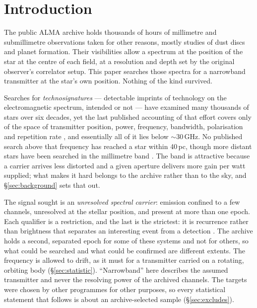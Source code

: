 \section{Introduction}
\label{sec:intro}

The public ALMA archive holds thousands of hours of millimetre and
submillimetre observations taken for other reasons, mostly studies of dust
discs and planet formation. Their visibilities allow a spectrum at the
position of the star at the centre of each field, at a resolution and depth
set by the original observer's correlator setup. This paper searches those
spectra for a narrowband transmitter at the star's own position. Nothing of
the kind survived.

Searches for \emph{technosignatures} --- detectable imprints of technology on
the electromagnetic spectrum, intended or not
\citep{Sheikh2020,SETIreview2025} --- have examined many thousands of stars
over six decades, yet the last published accounting of that effort covers
only \HaystackFrac{} of the space of transmitter position, power, frequency,
bandwidth, polarisation and repetition rate
\citep{Wright2018}, and essentially all of it lies below
${\sim}30$\,GHz. No published search above that frequency has reached a star
within 40\,pc, though more distant stars have been searched in the
millimetre band \citep{Mason2025}. The band is attractive because a carrier
arrives less distorted and a given aperture delivers more gain per watt
supplied; what makes it hard belongs to the archive rather than to the sky,
and \S\ref{sec:background} sets that out.

The signal sought is an \emph{unresolved spectral carrier}: emission confined
to a few channels, unresolved at the stellar position, and present at more
than one epoch. Each qualifier is a restriction, and the last is the
strictest: it is recurrence rather than brightness that separates an
interesting event from a detection \citep{Sheikh2021}. The archive holds a second,
separated epoch for some of these systems and not for others, so what could
be searched and what could be confirmed are different extents. The frequency is
allowed to drift, as it must for a transmitter carried on a rotating,
orbiting body (\S\ref{sec:statistic}). ``Narrowband'' here describes the
assumed transmitter and never the resolving power of the archived
channels. The targets
were chosen by other programmes for other purposes, so every statistical
statement that follows is about an archive-selected sample
(\S\ref{sec:excludes}).
